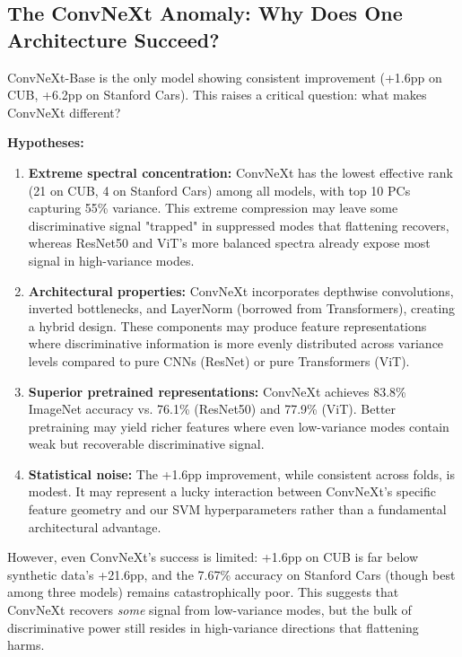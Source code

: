 \documentclass[11pt]{article}
\begin{document}
\subsection{The ConvNeXt Anomaly: Why Does One Architecture Succeed?}

ConvNeXt-Base is the only model showing consistent improvement (+1.6pp on CUB, +6.2pp on Stanford Cars). This raises a critical question: what makes ConvNeXt different?

\textbf{Hypotheses:}
\begin{enumerate}
    \item \textbf{Extreme spectral concentration:} ConvNeXt has the lowest effective rank (21 on CUB, 4 on Stanford Cars) among all models, with top 10 PCs capturing 55\% variance. This extreme compression may leave some discriminative signal "trapped" in suppressed modes that flattening recovers, whereas ResNet50 and ViT's more balanced spectra already expose most signal in high-variance modes.
    
    \item \textbf{Architectural properties:} ConvNeXt incorporates depthwise convolutions, inverted bottlenecks, and LayerNorm (borrowed from Transformers), creating a hybrid design. These components may produce feature representations where discriminative information is more evenly distributed across variance levels compared to pure CNNs (ResNet) or pure Transformers (ViT).
    
    \item \textbf{Superior pretrained representations:} ConvNeXt achieves 83.8\% ImageNet accuracy vs. 76.1\% (ResNet50) and 77.9\% (ViT). Better pretraining may yield richer features where even low-variance modes contain weak but recoverable discriminative signal.
    
    \item \textbf{Statistical noise:} The +1.6pp improvement, while consistent across folds, is modest. It may represent a lucky interaction between ConvNeXt's specific feature geometry and our SVM hyperparameters rather than a fundamental architectural advantage.
\end{enumerate}

However, even ConvNeXt's success is limited: +1.6pp on CUB is far below synthetic data's +21.6pp, and the 7.67\% accuracy on Stanford Cars (though best among three models) remains catastrophically poor. This suggests that ConvNeXt recovers \emph{some} signal from low-variance modes, but the bulk of discriminative power still resides in high-variance directions that flattening harms.
\end{document}
